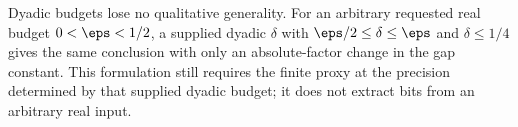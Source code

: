 Dyadic budgets lose no qualitative generality. For an arbitrary
requested real budget $0<\eps<1/2$, a supplied dyadic $\delta$ with
$\eps/2\leq\delta\leq\eps$ and $\delta\leq1/4$ gives the same
conclusion with only an absolute-factor change in the gap constant.
This formulation still requires the finite proxy at the precision
determined by that supplied dyadic budget; it does not extract bits
from an arbitrary real input.
